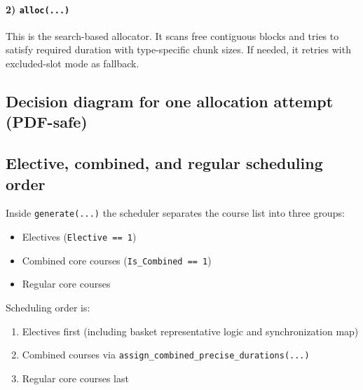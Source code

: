 \documentclass[12pt,a4paper]{article}
\begin{document}
\paragraph{2) \texttt{alloc(...)}}
This is the search-based allocator. It scans free contiguous blocks and tries to satisfy required duration with type-specific chunk sizes. If needed, it retries with excluded-slot mode as fallback.

\subsection{Decision diagram for one allocation attempt (PDF-safe)}
\begin{center}
\end{center}

\subsection{Elective, combined, and regular scheduling order}
Inside \texttt{generate(...)} the scheduler separates the course list into three groups:
\begin{itemize}[leftmargin=1.2cm]
  \item Electives (\texttt{Elective == 1})
  \item Combined core courses (\texttt{Is\_Combined == 1})
  \item Regular core courses
\end{itemize}

Scheduling order is:
\begin{enumerate}[leftmargin=1.2cm]
  \item Electives first (including basket representative logic and synchronization map)
  \item Combined courses via \texttt{assign\_combined\_precise\_durations(...)}
  \item Regular core courses last
\end{enumerate}
\end{document}
